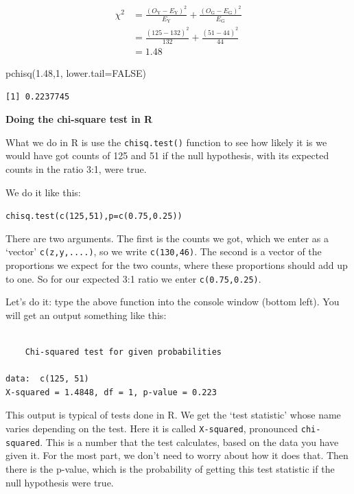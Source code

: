 \documentclass[
  letterpaper,
  DIV=11,
  numbers=noendperiod]{scrreprt}
\newenvironment{Shaded}{\begin{snugshade}}{\end{snugshade}}
\newcommand{\AttributeTok}[1]{\textcolor[rgb]{0.40,0.45,0.13}{#1}}
\newcommand{\ConstantTok}[1]{\textcolor[rgb]{0.56,0.35,0.01}{#1}}
\newcommand{\DecValTok}[1]{\textcolor[rgb]{0.68,0.00,0.00}{#1}}
\newcommand{\FloatTok}[1]{\textcolor[rgb]{0.68,0.00,0.00}{#1}}
\newcommand{\FunctionTok}[1]{\textcolor[rgb]{0.28,0.35,0.67}{#1}}
\newcommand{\NormalTok}[1]{\textcolor[rgb]{0.00,0.23,0.31}{#1}}
\begin{document}
\[
\begin{align}
\chi^2 &=\frac{(O_\text{Y}-E_\text{Y})^2}{E_\text{Y}} + \frac{(O_\text{G}-E_\text{G})^2}{E_\text{G}}\\
&=\frac{(125-132)^2}{132} + \frac{(51-44)^2}{44}\\
&=1.48
\end{align}
\]

\begin{Shaded}
\begin{Highlighting}[]
\FunctionTok{pchisq}\NormalTok{(}\FloatTok{1.48}\NormalTok{,}\DecValTok{1}\NormalTok{, }\AttributeTok{lower.tail=}\ConstantTok{FALSE}\NormalTok{)}
\end{Highlighting}
\end{Shaded}

\begin{verbatim}
[1] 0.2237745
\end{verbatim}

\textbf{Doing the chi-square test in R}

What we do in R is use the \texttt{chisq.test()} function to see how
likely it is we would have got counts of 125 and 51 if the null
hypothesis, with its expected counts in the ratio 3:1, were true.

We do it like this:

\texttt{chisq.test(c(125,51),p=c(0.75,0.25))}

There are two arguments. The first is the counts we got, which we enter
as a `vector' \texttt{c(z,y,....)}, so we write \texttt{c(130,46)}. The
second is a vector of the proportions we expect for the two counts,
where these proportions should add up to one. So for our expected 3:1
ratio we enter \texttt{c(0.75,0.25)}.

Let's do it: type the above function into the console window (bottom
left). You will get an output something like this:

\begin{verbatim}

    Chi-squared test for given probabilities

data:  c(125, 51)
X-squared = 1.4848, df = 1, p-value = 0.223
\end{verbatim}

This output is typical of tests done in R. We get the `test statistic'
whose name varies depending on the test. Here it is called
\texttt{X-squared}, pronounced \texttt{chi-squared}. This is a number
that the test calculates, based on the data you have given it. For the
most part, we don't need to worry about how it does that. Then there is
the p-value, which is the probability of getting this test statistic if
the null hypothesis were true.
\end{document}
